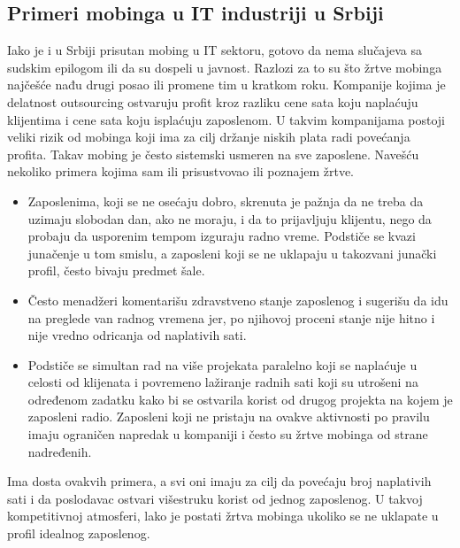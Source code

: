 \documentclass[a4paper]{article}
\begin{document}
    \subsection{Primeri mobinga u IT industriji u Srbiji}
    Iako je i u Srbiji prisutan mobing u IT sektoru, gotovo da nema slučajeva sa sudskim epilogom ili da su dospeli u javnost. Razlozi za to su što žrtve mobinga najčešće nađu drugi posao ili promene tim u kratkom roku. Kompanije kojima je delatnost outsourcing ostvaruju profit kroz razliku cene sata koju naplaćuju klijentima i cene sata koju isplaćuju zaposlenom. U takvim kompanijama postoji veliki rizik od mobinga koji ima za cilj držanje niskih plata radi povećanja profita. Takav mobing je često sistemski usmeren na sve zaposlene. Navešću nekoliko primera kojima sam ili prisustvovao ili poznajem žrtve.
    \begin{itemize}
        \item Zaposlenima, koji se ne osećaju dobro, skrenuta je pažnja da ne treba da uzimaju slobodan dan, ako ne moraju, i da to prijavljuju klijentu, nego da probaju da usporenim tempom izguraju radno vreme. Podstiče se kvazi junačenje u tom smislu, a zaposleni koji se ne uklapaju u takozvani junački profil, često bivaju predmet šale.
        \item Često menadžeri komentarišu zdravstveno stanje zaposlenog i sugerišu da idu na preglede van radnog vremena jer, po njihovoj proceni stanje nije hitno i nije vredno odricanja od naplativih sati.
        \item Podstiče se simultan rad na više projekata paralelno koji se naplaćuje u celosti od klijenata i povremeno lažiranje radnih sati koji su utrošeni na određenom zadatku kako bi se ostvarila korist od drugog projekta na kojem je zaposleni radio. Zaposleni koji ne pristaju na ovakve aktivnosti po pravilu imaju ograničen napredak u kompaniji i često su žrtve mobinga od strane nadređenih.
    \end{itemize}
    Ima dosta ovakvih primera, a svi oni imaju za cilj da povećaju broj naplativih sati i da poslodavac ostvari višestruku korist od jednog zaposlenog. U takvoj kompetitivnoj atmosferi, lako je postati žrtva mobinga ukoliko se ne uklapate u profil idealnog zaposlenog.
    
    
\end{document}
